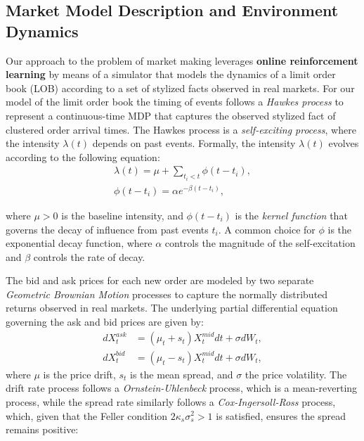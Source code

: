 \subsection{Market Model Description and Environment Dynamics}
\label{subsec:market-model-description-and-environment-dynamics}
Our approach to the problem of market making leverages \textbf{online reinforcement learning} by means of a simulator that models the dynamics of
a limit order book (LOB) according to a set of stylized facts observed in real markets.
For our model of the limit order book the timing of events follows a \textit{Hawkes process}
to represent a continuous-time MDP that captures the observed stylized fact of clustered order arrival times.
The Hawkes process is a \textit{self-exciting process}, where the intensity \( \lambda(t) \) depends on past events.
Formally, the intensity \( \lambda(t) \) evolves according to the following equation:
\begin{equation*}
    \begin{aligned}
        \lambda(t) = \mu + \sum_{t_i < t} \phi(t - t_i),\\
        \phi(t - t_i) = \alpha e^{-\beta (t - t_i)},
    \end{aligned}
\end{equation*}

where \( \mu > 0 \) is the baseline intensity, and \( \phi(t - t_i) \) is the \textit{kernel function} that governs the decay of influence from past events \( t_i \).
A common choice for \( \phi \) is the exponential decay function, where \(\alpha\) controls the magnitude of the self-excitation and \(\beta\) controls the rate of decay.

The bid and ask prices for each new order are modeled by two separate \textit{Geometric Brownian Motion} processes
to capture the normally distributed returns observed in real markets.
The underlying partial differential equation governing the ask and bid prices are given by:
\begin{equation*}
    \begin{aligned}
        dX_{t}^{ask} &= (\mu_t + s_t) X_{t}^{mid} dt + \sigma dW_t,\\
        dX_{t}^{bid} &= (\mu_t - s_t) X_{t}^{mid} dt + \sigma dW_t,
    \end{aligned}
    \label{eq:gbm}
\end{equation*}
where $\mu$ is the price drift, $s_t$ is the mean spread, and $\sigma$ the price volatility.
The drift rate process follows a \textit{Ornstein-Uhlenbeck} process, which is a mean-reverting process,
while the spread rate similarly follows a \textit{Cox-Ingersoll-Ross} process, which, given that the
Feller condition $2\kappa_s \sigma_s^2 > 1$ is satisfied, ensures the spread remains positive:

